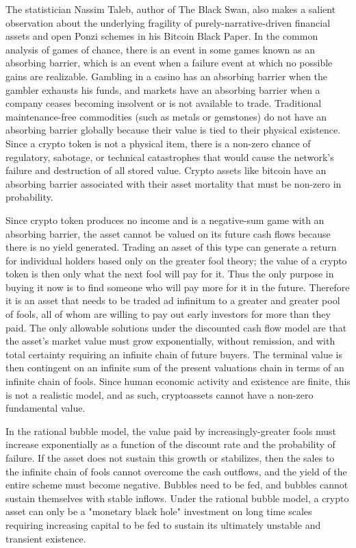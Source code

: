 
The statistician Nassim Taleb, author of The Black Swan, also makes a salient
observation about the underlying fragility of purely-narrative-driven financial
assets and open Ponzi schemes in his Bitcoin Black Paper. In the common analysis
of games of chance, there is an event in some games known as an absorbing
barrier, which is an event when a failure event at which no possible gains are
realizable. Gambling in a casino has an absorbing barrier when the gambler
exhausts his funds, and markets have an absorbing barrier when a company ceases
becoming insolvent or is not available to trade. Traditional maintenance-free
commodities (such as metals or gemstones) do not have an absorbing barrier
globally because their value is tied to their physical existence. Since a crypto
token is not a physical item, there is a non-zero chance of regulatory,
sabotage, or technical catastrophes that would cause the network's failure and
destruction of all stored value. Crypto assets like bitcoin have an absorbing
barrier associated with their asset mortality that must be non-zero in
probability. \cite{taleb_bitcoin_2021}


Since crypto token produces no income and is a negative-sum game with an
absorbing barrier, the asset cannot be valued on its future cash flows because
there is no yield generated. Trading an asset of this type can generate a return
for individual holders based only on the greater fool theory; the value of a
crypto token is then only what the next fool will pay for it. Thus the only
purpose in buying it now is to find someone who will pay more for it in the
future. Therefore it is an asset that needs to be traded ad infinitum to a
greater and greater pool of fools, all of whom are willing to pay out early
investors for more than they paid. The only allowable solutions under the
discounted cash flow model are that the asset's market value must grow
exponentially, without remission, and with total certainty requiring an infinite
chain of future buyers. The terminal value is then contingent on an infinite sum
of the present valuations chain in terms of an infinite chain of fools. Since
human economic activity and existence are finite, this is not a realistic model,
and as such, cryptoassets cannot have a non-zero fundamental value.

In the rational bubble model, the value paid by increasingly-greater fools must
increase exponentially as a function of the discount rate and the probability of
failure. If the asset does not sustain this growth or stabilizes, then the sales
to the infinite chain of fools cannot overcome the cash outflows, and the yield
of the entire scheme must become negative. Bubbles need to be fed, and bubbles
cannot sustain themselves with stable inflows. Under the rational bubble model,
a crypto asset can only be a "monetary black hole" investment on long time
scales requiring increasing capital to be fed to sustain its ultimately unstable
and transient existence.


